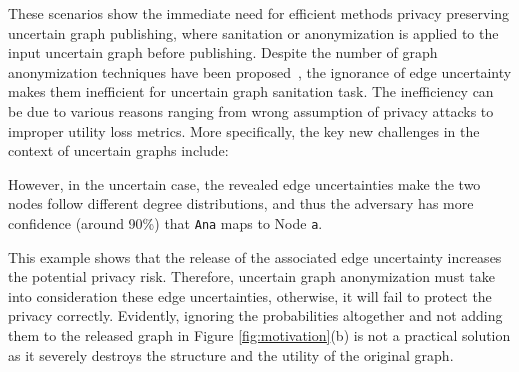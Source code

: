 \vspace{2mm}
These scenarios show the immediate need for efficient methods privacy preserving uncertain graph publishing, where sanitation or anonymization is applied to the input uncertain graph before publishing. Despite the number of graph anonymization techniques have been proposed~\cite{Liu_Towards_2008, Boldi_Injecting_2012,  Mittal_Preserving_2013, Nguyen_Anonymizing_2015, Liu_Privacy_2009, Ying_Randomizing_2008, Ninggal_Utility_2015,  Bonchi_Identity_2014}, the ignorance of edge uncertainty makes them inefficient for uncertain graph sanitation task. The inefficiency can be due to various reasons ranging from wrong assumption of privacy attacks to improper utility loss metrics. More specifically, the key new challenges in the context of uncertain graphs include:



\vspace{2mm}\hspace{-1em}
However, in the uncertain case, the revealed edge uncertainties make the two nodes follow different degree distributions, and thus  
the adversary has more confidence (around 90\%) that {\tt Ana} maps to Node {\tt a}. 

This example shows that the release of the associated edge uncertainty increases the potential privacy risk. 
Therefore, uncertain graph anonymization must take into consideration these edge uncertainties, otherwise, it will fail to protect the privacy correctly.  
Evidently, ignoring the probabilities altogether and not adding them to the released graph in Figure \ref{fig:motivation}(b) is not a practical solution as it 
severely destroys  the structure and the utility of the original graph. 


